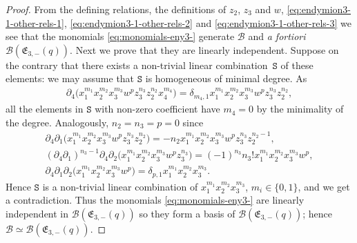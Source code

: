 \documentclass[pdftex]{sigma}
\numberwithin{equation}{section}
\newcommand{\toba}{\mathscr B}
\newcommand{\eny}{\mathfrak{E}}
\begin{document}
\begin{proof}
From the defining relations, the definitions of $z_2$, $z_3$ and $w$,
\eqref{eq:endymion3-1-other-rels-1}, \eqref{eq:endymion3-1-other-rels-2} and \eqref{eq:endymion3-1-other-rels-3}
we see that the monomials \eqref{eq:monomials-eny3-}
generate $\toba$ and \emph{a fortiori} $\toba(\eny_{3,-}(q))$.
Next we prove that they are linearly independent. Suppose on the contrary that there exists a non-trivial linear combination~$\mathtt{S}$ of these elements: we may assume that $\mathtt{S}$ is homogeneous of minimal degree. As
\begin{align*}
\partial_4 \big( x_1^{m_1} x_2^{m_2} x_3^{m_3} w^{p} z_{3}^{n_3}z_2^{n_2} x_4^{m_4} \big) = \delta_{m_4,1} x_1^{m_1} x_2^{m_2} x_3^{m_3} w^{p} z_{3}^{n_3}z_2^{n_2},
\end{align*}
all the elements in $\mathtt{S}$ with non-zero coefficient have $m_{4}=0$ by the minimality of the degree. Analogously, $n_2=n_3=p=0$ since
\begin{gather*}
\partial_4\partial_1 \big( x_1^{m_1} x_2^{m_2} x_3^{m_3} w^{p} z_{3}^{n_3}z_2^{n_2}\big) = -n_2 x_1^{m_1} x_2^{m_2} x_3^{m_3} w^{p} z_{3}^{n_3}z_2^{n_2-1},
\\[1mm]
(\partial_4\partial_1)^{n_3-1} \partial_4\partial_2 \big( x_1^{m_1} x_2^{m_2} x_3^{m_3} w^{p} z_{3}^{n_3}\big) = (-1)^{n_3}n_3! x_1^{m_1} x_2^{m_2} x_3^{m_3} w^{p},
\\[1mm]
\partial_4\partial_1\partial_2 \big( x_1^{m_1} x_2^{m_2} x_3^{m_3} w^{p}\big) = \delta_{p,1} x_1^{m_1} x_2^{m_2} x_3^{m_3}.
\end{gather*}
Hence $\mathtt{S}$ is a non-trivial linear combination of $x_1^{m_1} x_2^{m_2} x_3^{m_3}$, $m_i\in\{0,1\}$, and we get a contradiction. Thus the monomials \eqref{eq:monomials-eny3-} are linearly independent in $\toba(\eny_{3,-}(q))$
so they form a basis of $\toba(\eny_{3,-}(q))$; hence $\toba \simeq \toba(\eny_{3,-}(q))$.
\end{proof}
\end{document}

